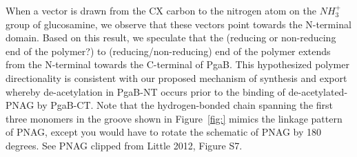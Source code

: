 
When a vector is drawn from the CX carbon to the nitrogen atom on the $NH_{3}^{+}$ group of glucosamine, we observe that these vectors point towards the N-terminal domain. Based on this result, we speculate that the (reducing or non-reducing end of the polymer?) to (reducing/non-reducing) end of the polymer extends from the N-terminal towards the C-terminal of PgaB.  This hypothesized polymer directionality is consistent with our proposed mechanism of synthesis and export whereby de-acetylation in PgaB-NT occurs prior to the binding of de-acetylated-PNAG by PgaB-CT.  Note that the hydrogen-bonded chain spanning the first three monomers in the groove shown in Figure~\ref{fig:} mimics the linkage pattern of PNAG, except you would have to rotate the schematic of PNAG by 180 degrees. See PNAG clipped from Little 2012, Figure S7.


